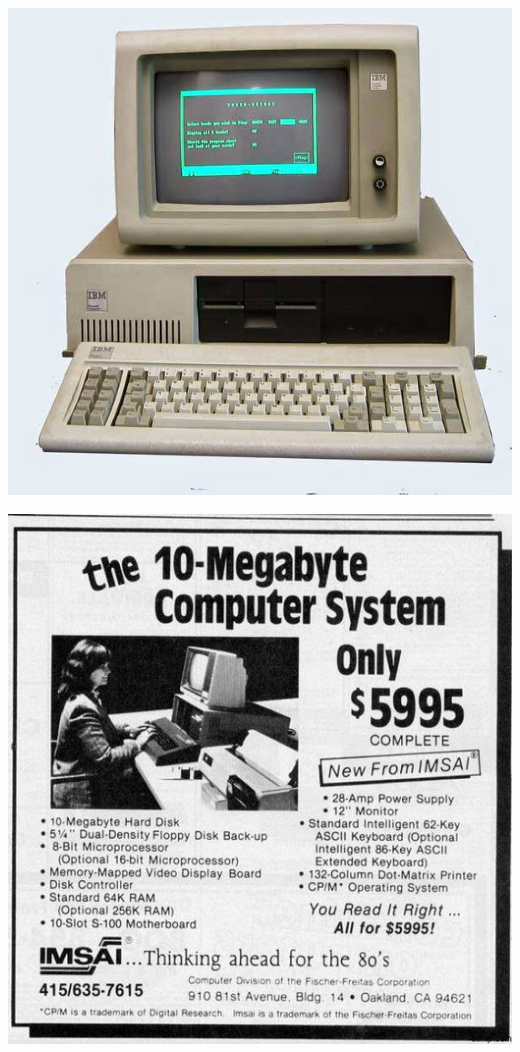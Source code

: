 \begin{multicols}{2}
	
		\begin{center}
	\includegraphics[height=.9\textheight]{./IMG/IBM_PC_XT_IMG_0502.jpg}
\end{center}

\vfill
\columnbreak

		\begin{center}
	\includegraphics[height=.9\textheight]{./IMG/309684611_437656465127036_2827131187209411270_n.jpg}
\end{center}

\end{multicols}
\vfill
\pagebreak

